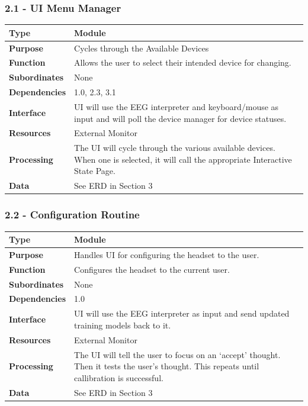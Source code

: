 \documentclass{article}
\begin{document}
\subsubsection*{2.1 - UI Menu Manager}
\begin{tabular}{ | l |  p{13.3cm} |}
\hline
\textbf{Type} & Module \\ \hline
\textbf{Purpose} & Cycles through the Available Devices \\ \hline
\textbf{Function} & Allows the user to select their intended device for changing. \\ \hline
\textbf{Subordinates} & None \\ \hline
\textbf{Dependencies} & 1.0, 2.3, 3.1 \\ \hline
\textbf{Interface} & UI will use the EEG interpreter and keyboard/mouse as input and will poll the device manager for device statuses.  \\ \hline
\textbf{Resources} & External Monitor \\ \hline
\textbf{Processing} & The UI will cycle through the various available devices. When one is selected, it will call the appropriate Interactive State Page. \\ \hline
\textbf{Data} & See ERD in Section 3 \\ \hline
\end{tabular}

\subsubsection*{2.2 - Configuration Routine}
\begin{tabular}{ | l |  p{13.3cm} |}
\hline
\textbf{Type} & Module \\ \hline
\textbf{Purpose} & Handles UI for configuring the headset to the user. \\ \hline
\textbf{Function} & Configures the headset to the current user. \\ \hline
\textbf{Subordinates} & None \\ \hline
\textbf{Dependencies} & 1.0 \\ \hline
\textbf{Interface} & UI will use the EEG interpreter as input and send updated training models back to it. \\ \hline
\textbf{Resources} & External Monitor \\ \hline
\textbf{Processing} & The UI will tell the user to focus on an `accept' thought. Then it tests the user's thought. This repeats until callibration is successful. \\ \hline
\textbf{Data} & See ERD in Section 3 \\ \hline
\end{tabular}
\end{document}
